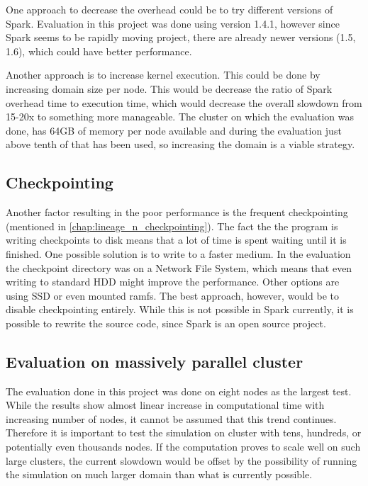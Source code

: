 \documentclass{l4proj}
\begin{document}
One approach to decrease the overhead could be to try different versions of Spark.
Evaluation in this project was done using version 1.4.1, however since Spark 
seems to be rapidly moving project, there are already newer versions (1.5, 1.6), which could have 
better performance.

Another approach is to increase kernel execution. This could be done by increasing
domain size per node. This would be decrease the ratio of Spark overhead time to 
execution time, which would decrease the overall slowdown from 15-20x to 
something more manageable. The cluster on which the evaluation was done, has 64GB
of memory per node available and during the evaluation just above tenth of that
has been used, so increasing the domain is a viable strategy.

\subsection{Checkpointing}

Another factor resulting in the poor performance is the frequent checkpointing
(mentioned in \autoref{chap:lineage_n_checkpointing}). The fact the the program
is writing checkpoints to disk means that a lot of time is spent waiting until
it is finished. One possible solution is to write to a faster medium. In the evaluation
the checkpoint directory was on a Network File System, which means that even 
writing to standard HDD might improve the performance. Other options are using SSD
or even mounted ramfs. The best approach, however, would be to disable checkpointing
entirely. While this is not possible in Spark currently, it is possible to rewrite 
the source code, since Spark is an open source project.

\subsection{Evaluation on massively parallel cluster}

The evaluation done in this project was done on eight nodes as the largest test.
While the results show almost linear increase in computational time with
increasing number of nodes, it cannot be assumed that this trend continues.
Therefore it is important to test the simulation on cluster with tens, hundreds,
or potentially even thousands nodes. If the computation proves to scale well
on such large clusters, the current slowdown would be offset by the 
possibility of running the simulation on much larger domain than what is
currently possible.
\end{document}
